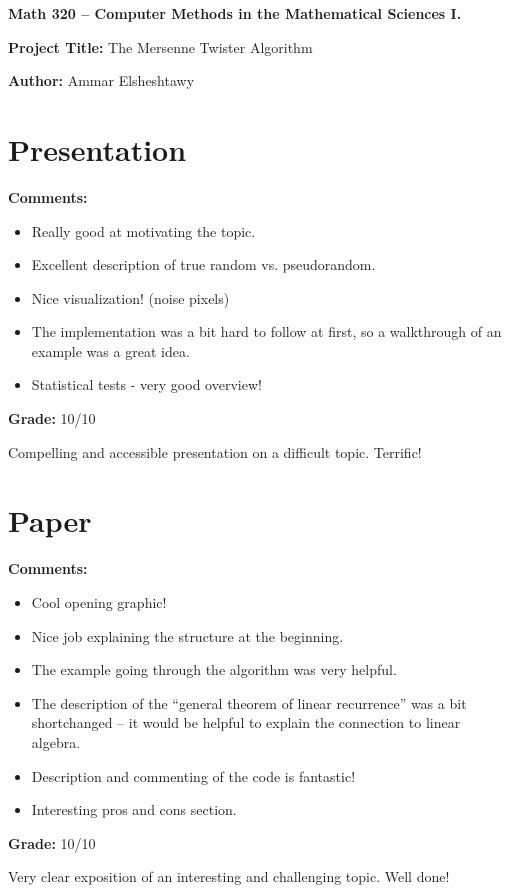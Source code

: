 \documentclass[12pt]{article}
\begin{document}
{\bf \large Math 320 -- Computer Methods in the Mathematical Sciences I.}\\

\vspace{3mm}

{\bf \large Project Title:} The Mersenne Twister Algorithm\\
\vspace{2mm}

{\bf \large Author:} Ammar Elsheshtawy\\

\vspace{3mm}

\section{Presentation}
{\bf \large Comments:}
\begin{itemize}
\item Really good at motivating the topic.
\item Excellent description of true random vs. pseudorandom.
\item Nice visualization! (noise pixels)
\item The implementation was a bit hard to follow at first, so
a walkthrough of an example was a great idea.
\item Statistical tests - very good overview!
\end{itemize}

{\bf \large Grade:} 10/10

Compelling and accessible presentation on a difficult topic.
Terrific!

\section{Paper}

{\bf \large Comments:}
\begin{itemize}
\item Cool opening graphic!
\item Nice job explaining the structure at the beginning.
\item The example going through the algorithm was very helpful.
\item The description of the ``general theorem of linear recurrence''
was a bit shortchanged -- it would be helpful to explain the connection
to linear algebra.
\item Description and commenting of the code is fantastic!
\item Interesting pros and cons section.
\end{itemize}

{\bf \large Grade:} 10/10

Very clear exposition of an interesting and challenging topic.
Well done!
\end{document}
